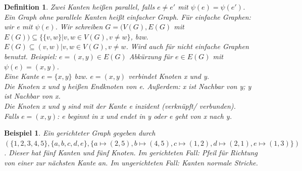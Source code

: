\documentclass{beamer}
\newtheorem{defi}[satz]{Definition}
\newtheorem{beispiel}[satz]{Beispiel}
\begin{document}
  \begin{frame}
  \vfill
    \begin{center}
      \begin{defi} 
        Zwei Kanten heißen parallel, falls $e\neq e'$ mit $\psi(e)= \psi (e')$.\\
        Ein Graph ohne parallele Kanten heißt einfacher Graph.
        Für einfache Graphen: wir e mit $\psi (e)$.
        Wir schreiben $G= (V(G), E(G)$ mit $E(G)) \subseteq \{\{v,w\}| v,w \in V(G), v\neq w\}$, bzw. $E(G)\subseteq {(v,w)| v,w\in V(G), v\neq w}$.
        Wird auch für nicht einfache Graphen benutzt.
        Beispiel: $e= (x,y) \in E(G)$ Abkürzung für $e\in  E(G)$ mit $\psi (e)=(x,y)$. \\

        Eine Kante $e=\{x,y\}$ bzw. $e= (x,y)$ verbindet Knoten x und y.\\
        Die Knoten x und y heißen Endknoten von e. Außerdem: x ist Nachbar von y; y ist Nachbar von x.\\
        Die Knoten x und y sind mit der Kante e inzident (verknüpft/ verbunden). \\
        Falls $e=(x,y)$: e beginnt in x und endet in y oder e geht von x nach y.\\
      \end{defi}
    \end{center}
  \vfill
  \end{frame}

  \begin{frame}
  \vfill
    \begin{center}
      \begin{beispiel} 
        Ein gerichteter Graph gegeben durch $(\{1,2,3,4,5\}, \{a,b,c,d,e\}, \{a\mapsto  (2,5), b\mapsto (4,5), c\mapsto (1,2), d\mapsto (2,1), e\mapsto (1,3)\})$. 
        Dieser hat fünf Kanten und fünf Knoten.
        Im gerichteten Fall: Pfeil für Richtung von einer zur nächsten Kante an.
       Im ungerichteten Fall:  Kanten normale Striche.
  \end{beispiel}
    \end{center}
  \vfill
  \end{frame}
\end{document}
